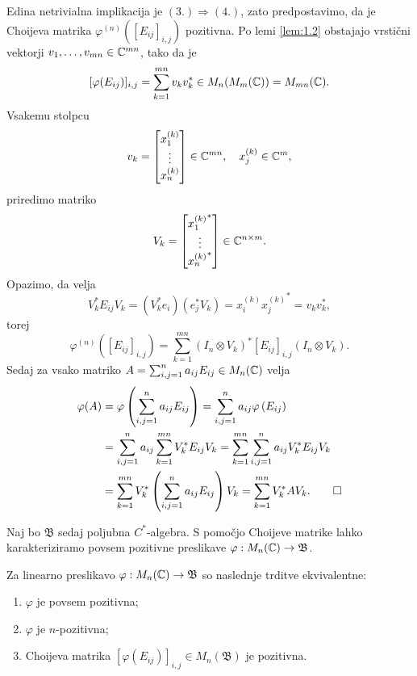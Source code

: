 \begin{dokaz}
    Edina netrivialna implikacija je $(3.) \Rightarrow (4.)$, zato predpostavimo,
    da je Choijeva matrika $\varphi^{(n)}([E_{ij}]_{i, j})$ pozitivna.
    Po lemi \ref{lem:1.2} obstajajo vrstični vektorji $v_1, \dots, v_{mn} \in \mathbb C^{mn}$, tako da je 
    $$[\varphi (E_{ij})]_{i, j} = \sum_{k = 1} ^{mn} v_k v_k ^* \in M_n (M_m (\mathbb C)) = M_{mn} (\mathbb C).$$
    Vsakemu stolpcu
    $$v_k = \begin{bmatrix}
        x_1 ^{(k)}  \\ \vdots \\ x_n ^{(k)}
    \end{bmatrix} \in \mathbb C^{mn},\quad x_j ^{(k)} \in \mathbb C^{ m},$$
    priredimo matriko 
    $$V_k = \begin{bmatrix}
        {x_1 ^{(k)}} ^* \\
         \vdots \\
         {x_n ^{(k)} }^*
    \end{bmatrix} \in \mathbb C^{n \times m}.$$
    Opazimo, da velja
    $$V_k ^* E_{ij} V_k  = (V_k ^* e_i) (e_j^* V_k)  = {x_i ^{(k)}} {x_j ^{(k)}} ^* = v_k v_k ^*,$$
    torej
    $$\varphi^{(n)} ([E_{ij}]_{i, j}) = \sum_{k = 1} ^{mn} (I_n \otimes V_k)^* [E_{ij}]_{i, j} (I_n \otimes V_k).$$ 
    Sedaj za vsako matriko $A = \sum_{i, j = 1} ^n a_{ij} E_{ij} \in M_{n} (\mathbb C)$ velja
    \begin{align*}
        \varphi (A) &= \varphi \left(\sum_{i, j = 1} ^n a_{ij} E_{ij}\right) = \sum_{i, j = 1} ^n a_{ij} \varphi \left(E_{ij}\right)\\
        &= \sum_{i, j = 1} ^n a_{ij} \sum_{k = 1}^{mn} V_k ^* E_{ij} V_k = \sum_{k = 1}^{mn} \sum_{i, j = 1} ^n a_{ij} V_k ^* E_{ij} V_k\\
        &= \sum_{k = 1}^{mn} V_k ^* \left( \sum_{i, j = 1} ^n a_{ij} E_{ij} \right) V_k = \sum_{k = 1}^{mn} V_k ^* A V_k. \qedhere
    \end{align*}
\end{dokaz}


Naj bo $\mathfrak{B}$ sedaj poljubna $C^*$-algebra.
S pomočjo Choijeve matrike lahko karakteriziramo povsem pozitivne preslikave $\varphi: M_n (\mathbb C) \to \mathfrak{B}$.

\begin{trditev}\label{trd:1.6}
    Za linearno preslikavo $\varphi: M_n (\mathbb C) \to \mathfrak{B}$ so naslednje
    trditve ekvivalentne:
    \begin{enumerate}
        \item $\varphi$ je povsem pozitivna;
        \item $\varphi$ je $n$-pozitivna;
        \item Choijeva matrika $[\varphi (E_{ij})]_{i, j} \in M_n (\mathfrak{B})$ je pozitivna.
    \end{enumerate}
\end{trditev}

